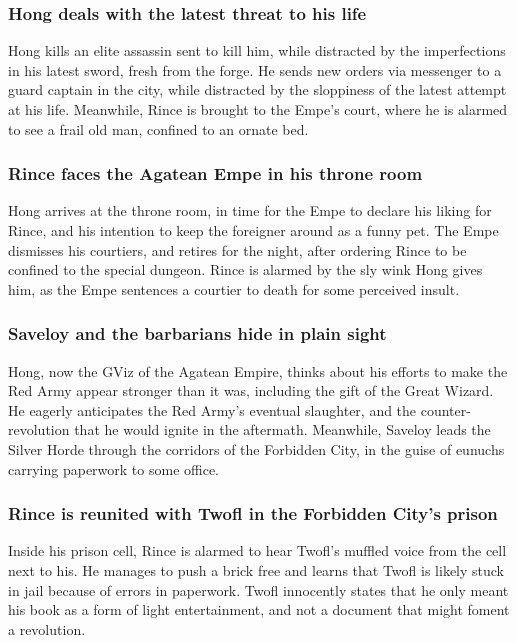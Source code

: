 \subsubsection{\Gls{Hong} deals with the latest threat to his life}
\Gls{Hong} kills an elite assassin sent to kill him, while distracted by the imperfections in his
latest sword, fresh from the forge. He sends new orders via messenger to a guard captain in the
city, while distracted by the sloppiness of the latest attempt at his life. Meanwhile, \Gls{Rince}
is brought to the \Gls{Empe}'s court, where he is alarmed to see a frail old man, confined to an
ornate bed.

\subsubsection{\Gls{Rince} faces the Agatean \Gls{Empe} in his throne room}
\Gls{Hong} arrives at the throne room, in time for the \Gls{Empe} to declare his liking for
\Gls{Rince}, and his intention to keep the foreigner around as a funny pet. The \Gls{Empe} dismisses
his courtiers, and retires for the night, after ordering \Gls{Rince} to be confined to the special
dungeon. \Gls{Rince} is alarmed by the sly wink \Gls{Hong} gives him, as the \Gls{Empe} sentences
a courtier to death for some perceived insult.

\subsubsection{\Gls{Saveloy} and the barbarians hide in plain sight}
\Gls{Hong}, now the \Gls{GViz} of the Agatean Empire, thinks about his efforts to make the Red Army
appear stronger than it was, including the gift of the Great Wizard. He eagerly anticipates the
Red Army's eventual slaughter, and the counter-revolution that he would ignite in the aftermath.
Meanwhile, \Gls{Saveloy} leads the Silver Horde through the corridors of the Forbidden City, in the
guise of eunuchs carrying paperwork to some office.

\subsubsection{\Gls{Rince} is reunited with \Gls{Twofl} in the Forbidden City's prison}
Inside his prison cell, \Gls{Rince} is alarmed to hear \Gls{Twofl}'s muffled voice from the cell
next to his. He manages to push a brick free and learns that \Gls{Twofl} is likely stuck in jail
because of errors in paperwork. \Gls{Twofl} innocently states that he only meant his book as a form
of light entertainment, and not a document that might foment a revolution.

